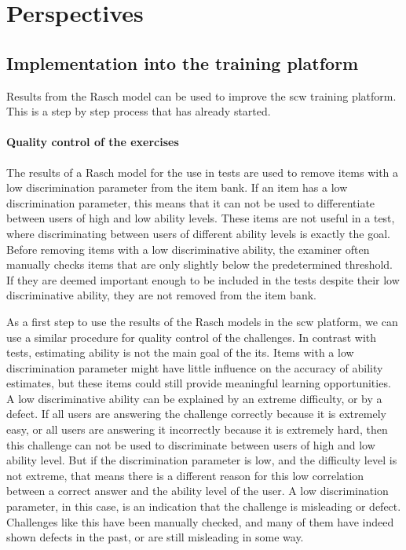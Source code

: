 \section{Perspectives}
\label{sec:its-perspectives}

\subsection{Implementation into the training platform}
Results from the Rasch model can be used to improve the \gls{scw} training platform.
This is a step by step process that has already started.

\paragraph{Quality control of the exercises}
The results of a Rasch model for the use in tests are used to remove items with a low discrimination parameter from the item bank. 
If an item has a low discrimination parameter, this means that it can not be used to differentiate between users of high and low ability levels.
These items are not useful in a test, where discriminating between users of different ability levels is exactly the goal.
Before removing items with a low discriminative ability, the examiner often manually checks items that are only slightly below the predetermined threshold.
If they are deemed important enough to be included in the tests despite their low discriminative ability, they are not removed from the item bank.

As a first step to use the results of the Rasch models in the \gls{scw} platform, we can use a similar procedure for quality control of the challenges.
In contrast with tests, estimating ability is not the main goal of the \gls{its}.
Items with a low discrimination parameter might have little influence on the accuracy of ability estimates, but these items could still provide meaningful learning opportunities.
A low discriminative ability can be explained by an extreme difficulty, or by a defect.
If all users are answering the challenge correctly because it is extremely easy, or all users are answering it incorrectly because it is extremely hard, then this challenge can not be used to discriminate between users of high and low ability level.
But if the discrimination parameter is low, and the difficulty level is not extreme, that means there is a different reason for this low correlation between a correct answer and the ability level of the user.
A low discrimination parameter, in this case, is an indication that the challenge is misleading or defect.
Challenges like this have been manually checked, and many of them have indeed shown defects in the past, or are still misleading in some way.

